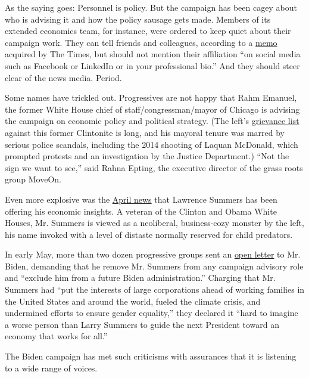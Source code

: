 As the saying goes: Personnel is policy. But the campaign has been cagey
about who is advising it and how the policy sausage gets made. Members
of its extended economics team, for instance, were ordered to keep quiet
about their campaign work. They can tell friends and colleagues,
according to a
\href{https://www.nytimes3xbfgragh.onion/2020/06/11/us/politics/joe-biden-campaign-economy.html}{memo}
acquired by The Times, but should not mention their affiliation ``on
social media such as Facebook or LinkedIn or in your professional bio.''
And they should steer clear of the news media. Period.

Some names have trickled out. Progressives are not happy that Rahm
Emanuel, the former White House chief of staff/congressman/mayor of
Chicago is advising the campaign on economic policy and political
strategy. (The left's
\href{https://www.salon.com/2015/03/23/why_the_left_hates_this_man_rahm_emanuels_sins_against_the_progressive_movement/}{grievance
list} against this former Clintonite is long, and his mayoral tenure was
marred by serious police scandals, including the 2014 shooting of Laquan
McDonald, which prompted protests and an investigation by the Justice
Department.) ``Not the sign we want to see,'' said Rahna Epting, the
executive director of the grass roots group MoveOn.

Even more explosive was the
\href{https://www.bloomberg.com/news/articles/2020-04-23/larry-summers-advising-biden-campaign-on-economic-recovery}{April
news} that Lawrence Summers has been offering his economic insights. A
veteran of the Clinton and Obama White Houses, Mr. Summers is viewed as
a neoliberal, business-cozy monster by the left, his name invoked with a
level of distaste normally reserved for child predators.

In early May, more than two dozen progressive groups sent an
\href{https://assets.bwbx.io/documents/users/iqjWHBFdfxIU/rq88fcCcNRP8/v0}{open
letter} to Mr. Biden, demanding that he remove Mr. Summers from any
campaign advisory role and ``exclude him from a future Biden
administration.'' Charging that Mr. Summers had ``put the interests of
large corporations ahead of working families in the United States and
around the world, fueled the climate crisis, and undermined efforts to
ensure gender equality,'' they declared it ``hard to imagine a worse
person than Larry Summers to guide the next President toward an economy
that works for all.''

The Biden campaign has met such criticisms with assurances that it is
listening to a wide range of voices.

